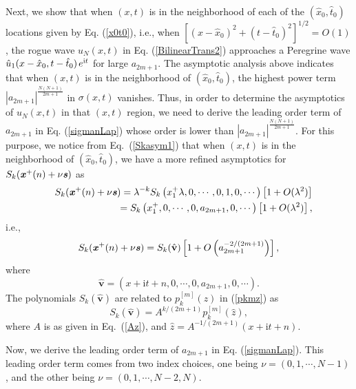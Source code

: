 \documentclass[amsmath,amssymb]{revtex4}
\def\[{\begin{equation}}
\def\]{\end{equation}}
\begin{document}
Next, we show that when $(x, t)$ is in the neighborhood of each of the $\left(\hat{x}_{0}, \hat{t}_{0}\right)$ locations given by Eq. (\ref{x0t0}), i.e., when $\left[(x-\hat{x}_{0})^2+(t-\hat{t}_{0})^2\right]^{1/2}=O(1)$, the rogue wave $u_N(x,t)$ in Eq. (\ref{BilinearTrans2}) approaches a Peregrine wave $\hat{u}_1(x-\hat{x}_{0}, t-\hat{t}_{0})\hspace{0.05cm} e^{\textrm{i}t}$ for large $a_{2m+1}$. The asymptotic analysis above indicates that when $(x, t)$ is in the neighborhood of $\left(\hat{x}_{0}, \hat{t}_{0}\right)$, the highest power term $|a_{2m+1}|^{\frac{N(N+1)}{2m+1}}$ in $\sigma(x,t)$ vanishes. Thus, in order to determine the asymptotics of $u_N(x,t)$ in that $(x,t)$ region, we need to derive the leading order term of $a_{2m+1}$ in Eq. (\ref{sigmanLap}) whose order is lower than $|a_{2m+1}|^{\frac{N(N+1)}{2m+1}}$. For this purpose, we notice from Eq.~(\ref{Skasym1}) that when $(x, t)$ is in the neighborhood of $\left(\hat{x}_{0}, \hat{t}_{0}\right)$, we have a more refined asymptotics for $S_k(\textbf{\emph{x}}^{+}(n)+\nu \textbf{\emph{s}})$ as
\begin{eqnarray}\label{Skasym2}
&& S_{k}(\textbf{\emph{x}}^{+}(n) +\nu \textbf{\emph{s}}) = \lambda^{-k} S_{k}\left(x_1^+ \lambda, 0, \cdots, 0, 1, 0, \cdots\right)\left[1+O(\lambda^{2})\right] \nonumber \\
&&\hspace{2.1cm} =S_{k}\left(x_1^+, 0, \cdots, 0, a_{2m+1}, 0, \cdots\right)\left[1+O(\lambda^{2})\right],
\end{eqnarray}
i.e.,
\[ \label{Skxnasym2}
S_k(\textbf{\emph{x}}^{+}(n) +\nu \textbf{\emph{s}}) = S_k(\hat{\textbf{v}}) \left[1+O\left(a_{2m+1}^{-2/(2m+1)}\right)\right],
\]
where
\[\label{vhatdef}
\hat{\textbf{v}}=(x+\textrm{i}t+n, 0, \cdots, 0, a_{2m+1}, 0, \cdots).
\]
The polynomials $S_k(\hat{\textbf{v}})$ are related to $p_{k}^{[m]}(z)$ in (\ref{pkmz}) as
\begin{equation} \label{Skorder2}
S_k(\hat{\textbf{v}})=A^{k/(2m+1)}p_{k}^{[m]}(\hat{z}),
\end{equation}
where $A$ is as given in Eq.~(\ref{Az}), and $\hat{z}=A^{-1/(2m+1)}(x+\textrm{i}t+n)$.

Now, we derive the leading order term of $a_{2m+1}$ in Eq. (\ref{sigmanLap}). This leading order term comes from two index choices, one being $\nu=(0, 1, \cdots, N-1)$, and the other being $\nu=(0, 1, \cdots, N-2, N)$.
\end{document}
